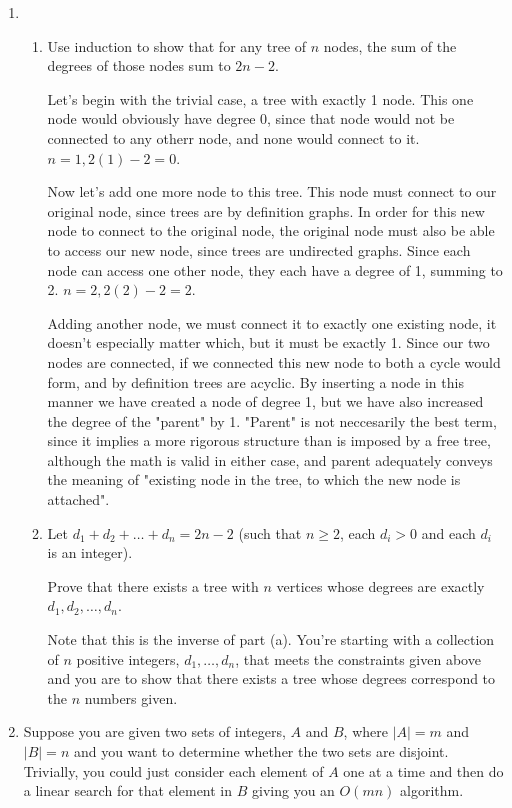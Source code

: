 \documentclass[11pt]{article}
\begin{document}
\begin{enumerate}[1.]

\item 

\begin{enumerate}
\item Use induction to show that for any tree of $n$ nodes, the sum of the degrees of those nodes sum to $2n-2$.

	Let's begin with the trivial case, a tree with exactly 1 node.  This one node would obviously have degree 0, since that node would not be connected to any otherr node, and none would connect to it. $n=1, 2(1)-2=0$.

	Now let's add  one more node to this tree.  This node must connect to our original node, since trees are by definition graphs.  In order for this new node to connect to the original node, the original node must also be able to access our new node, since trees are undirected graphs.  Since each node can access one other node, they each have a degree of 1, summing to 2. $n=2, 2(2)-2=2$.

	Adding another node, we must connect it to exactly one existing node, it doesn't especially matter which, but it must be exactly 1.  Since our two nodes are connected, if we connected this new node to both a cycle would form, and by definition trees are acyclic. By inserting a node in this manner we have created a node of degree 1, but we have also increased the degree of the "parent" by 1.  "Parent" is not neccesarily the best term, since it implies a more rigorous structure than is imposed by a free tree, although the math is valid in either case, and parent adequately conveys the meaning of "existing node in the tree, to which the new node is attached". 

\item Let $d_1 + d_2 + \ldots + d_n = 2n - 2$ (such that $n \geq 2$, each $d_i > 0$ and each $d_i$ is an integer).  

Prove that there exists a tree with $n$ vertices whose degrees are exactly $d_1, d_2, \ldots, d_n$.

Note that this is the inverse of part (a).  You're starting with a collection of $n$ positive integers, $d_1, \ldots, d_n$, that meets the constraints given above and you are to show that there exists a tree whose degrees correspond to the $n$ numbers given.  
\end{enumerate}


\item  Suppose you are given two sets of integers, $A$ and $B$, where $|A| = m$ and $|B| = n$ and you want to determine whether the two sets are disjoint.  Trivially, you could just consider each element of $A$ one at a time and then do a linear search for that element in $B$ giving you an $O(mn)$ algorithm.  


\end{enumerate}
\end{document}
